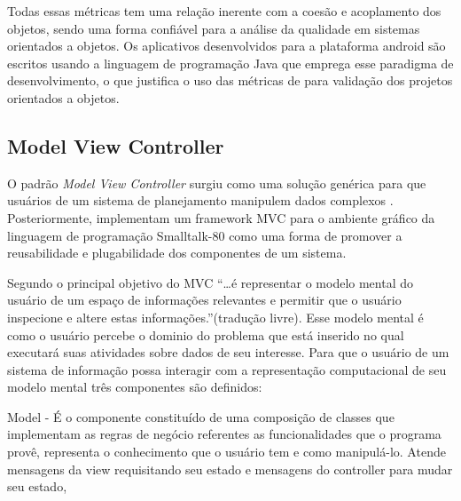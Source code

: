 \documentclass[conference]{IEEEtran}
\begin{document}
%	



Todas essas métricas tem uma relação inerente com a coesão e acoplamento dos
objetos, sendo uma forma confiável para a análise da qualidade em sistemas
orientados a objetos. Os aplicativos desenvolvidos para a plataforma android são
escritos usando a linguagem de programação Java que emprega esse paradigma de
desenvolvimento, o que justifica o uso das métricas de \cite{cksuite} para
validação dos projetos orientados a objetos.

\subsection{Model View Controller}

O padrão \textit{Model View Controller} surgiu como uma solução genérica para
que usuários de um sistema de planejamento manipulem dados complexos
\cite{Reenskaug:1979}. Posteriormente, \cite{krasnerPope1988}
implementam um framework MVC para o ambiente gráfico da linguagem de programação
Smalltalk-80 como uma forma de promover a reusabilidade e plugabilidade dos
componentes de um sistema.

Segundo \cite{Reenskaug:1979} o principal objetivo do MVC
``\ldots é representar o modelo mental do usuário de um espaço de informações
relevantes e permitir que o usuário inspecione e altere estas
informações.''(tradução livre).
Esse modelo mental é como o usuário percebe o dominio do problema que está inserido no qual executará suas atividades sobre dados de seu interesse. Para que o usuário de um sistema de
informação possa interagir com a representação computacional  de seu modelo
mental três componentes são definidos:

Model - É o componente constituído de uma composição de classes que implementam
as regras de negócio referentes as funcionalidades que o programa provê,
representa o  conhecimento que o usuário tem e como manipulá-lo. Atende
mensagens da view requisitando seu estado e mensagens do controller para mudar
seu estado,
\end{document}
